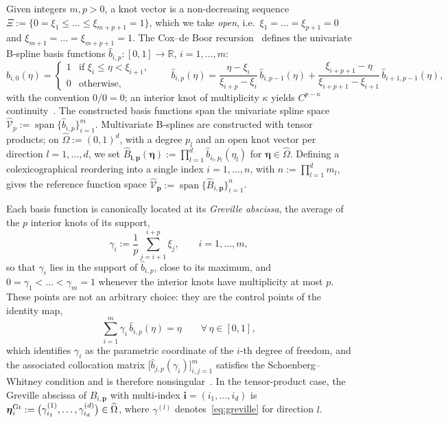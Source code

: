 \documentclass{article}
\newcommand{\vect}[1]{\boldsymbol{#1}}
\newcommand{\R}{\mathbb{R}}
\DeclareMathOperator{\spann}{span}
\newcommand{\refdom}{\widehat{\Omega}}            %
\newcommand{\bsuni}[2]{\widehat{b}_{#1,#2}}      %
\newcommand{\Bref}[2]{\widehat{B}_{#1,#2}}       %
\newcommand{\Shat}[1]{\widehat{\mathcal{V}}_{#1}} %
\theoremstyle{plain}
\numberwithin{equation}{section}
\begin{document}
Given integers $m, p > 0$, a knot vector is a non-decreasing sequence
$\Xi := \{0 = \xi_1 \le \dots \le \xi_{m+p+1} = 1\}$, which we take \emph{open},
i.e.\ $\xi_1 = \dots = \xi_{p+1} = 0$ and $\xi_{m+1} = \dots = \xi_{m+p+1} = 1$.
The Cox--de Boor recursion~\cite{de1978practical} defines the univariate B-spline
basis functions $\bsuni{i}{p} : [0,1] \to \R$, $i = 1, \dots, m$:
\begin{equation*}
    \bsuni{i}{0}(\eta) =
    \begin{cases}
        1 & \text{if } \xi_i \le \eta < \xi_{i+1}, \\
        0 & \text{otherwise},
    \end{cases}
    \qquad
    \bsuni{i}{p}(\eta) =
    \frac{\eta - \xi_i}{\xi_{i+p} - \xi_i}\, \bsuni{i}{p-1}(\eta)
    + \frac{\xi_{i+p+1} - \eta}{\xi_{i+p+1} - \xi_{i+1}}\, \bsuni{i+1}{p-1}(\eta),
\end{equation*}
with the convention $0/0 = 0$; an interior knot of multiplicity $\kappa$ yields
$C^{p-\kappa}$ continuity~\cite{cottrell2009isogeometric}. The constructed basis functions span the univariate
spline space $\Shat{p} := \spann\{\bsuni{i}{p}\}_{i=1}^{m}$.
Multivariate B-splines are constructed with tensor products; on $\refdom := (0,1)^d$,
with a degree $p_l$ and an open knot vector per direction $l = 1, \dots, d$, we
set $\Bref{\vect{i}}{\vect{p}}(\vect{\eta}) := \prod_{l=1}^{d}
    \bsuni{i_l}{p_l}(\eta_l)$ for $\vect{\eta} \in \refdom$. Defining a
colexicographical reordering into a single index $i = 1, \dots, n$, with
$n := \prod_{l=1}^{d} m_l$, gives the reference function space $\Shat{\vect{p}} :=
    \spann\{\Bref{i}{\vect{p}}\}_{i=1}^{n}$.

Each basis function is canonically located at its \emph{Greville abscissa}, the
average of the $p$ interior knots of its support,
\begin{equation}
    \gamma_i := \frac{1}{p} \sum_{j=i+1}^{i+p} \xi_j,
    \qquad i = 1, \dots, m,
    \label{eq:greville}
\end{equation}
so that $\gamma_i$ lies in the support of $\bsuni{i}{p}$, close to its maximum,
and $0 = \gamma_1 < \dots < \gamma_m = 1$ whenever the interior knots have
multiplicity at most $p$.  These points are not an arbitrary choice: they are the
control points of the identity map,
\begin{equation}
    \sum_{i=1}^{m} \gamma_i\, \bsuni{i}{p}(\eta) = \eta
    \qquad \forall\, \eta \in [0,1],
    \label{eq:greville-identity}
\end{equation}
which identifies $\gamma_i$ as the parametric coordinate of the $i$-th degree of
freedom, and the associated collocation matrix
$\bigl[\bsuni{j}{p}(\gamma_i)\bigr]_{i,j=1}^{m}$ satisfies the
Schoenberg--Whitney condition and is therefore
nonsingular~\cite{de1978practical}.  In the tensor-product case, the Greville
abscissa of $\Bref{i}{\vect{p}}$ with multi-index $\vect{i} = (i_1, \dots, i_d)$
is $\vect\eta_i^{\rm Gr} := \bigl(\gamma_{i_1}^{(1)}, \dots,
    \gamma_{i_d}^{(d)}\bigr) \in \refdom$, where $\gamma^{(l)}$
denotes~\eqref{eq:greville} for direction $l$.
\end{document}
